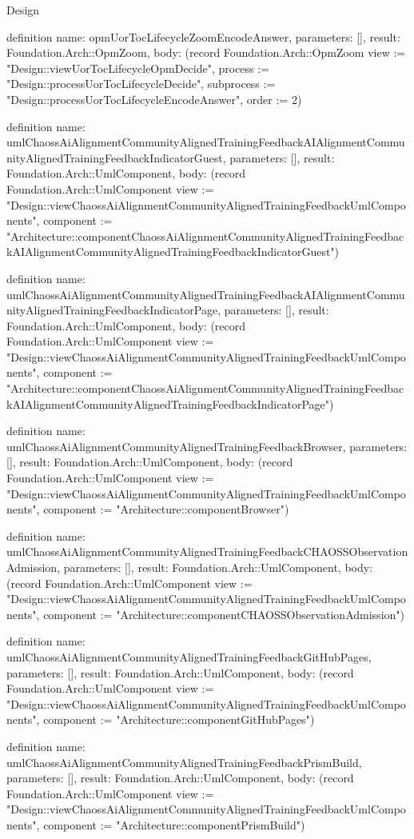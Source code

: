 \begin{lexlean}{Design}
\begin{semanticmodule}
definition{
  name: opmUorTocLifecycleZoomEncodeAnswer,
  parameters: [],
  result: Foundation.Arch::OpmZoom,
  body: (record Foundation.Arch::OpmZoom {view := "Design::viewUorTocLifecycleOpmDecide", process := "Design::processUorTocLifecycleDecide", subprocess := "Design::processUorTocLifecycleEncodeAnswer", order := 2})
}

definition{
  name: umlChaossAiAlignmentCommunityAlignedTrainingFeedbackAIAlignmentCommunityAlignedTrainingFeedbackIndicatorGuest,
  parameters: [],
  result: Foundation.Arch::UmlComponent,
  body: (record Foundation.Arch::UmlComponent {view := "Design::viewChaossAiAlignmentCommunityAlignedTrainingFeedbackUmlComponents", component := "Architecture::componentChaossAiAlignmentCommunityAlignedTrainingFeedbackAIAlignmentCommunityAlignedTrainingFeedbackIndicatorGuest"})
}

definition{
  name: umlChaossAiAlignmentCommunityAlignedTrainingFeedbackAIAlignmentCommunityAlignedTrainingFeedbackIndicatorPage,
  parameters: [],
  result: Foundation.Arch::UmlComponent,
  body: (record Foundation.Arch::UmlComponent {view := "Design::viewChaossAiAlignmentCommunityAlignedTrainingFeedbackUmlComponents", component := "Architecture::componentChaossAiAlignmentCommunityAlignedTrainingFeedbackAIAlignmentCommunityAlignedTrainingFeedbackIndicatorPage"})
}

definition{
  name: umlChaossAiAlignmentCommunityAlignedTrainingFeedbackBrowser,
  parameters: [],
  result: Foundation.Arch::UmlComponent,
  body: (record Foundation.Arch::UmlComponent {view := "Design::viewChaossAiAlignmentCommunityAlignedTrainingFeedbackUmlComponents", component := "Architecture::componentBrowser"})
}

definition{
  name: umlChaossAiAlignmentCommunityAlignedTrainingFeedbackCHAOSSObservationAdmission,
  parameters: [],
  result: Foundation.Arch::UmlComponent,
  body: (record Foundation.Arch::UmlComponent {view := "Design::viewChaossAiAlignmentCommunityAlignedTrainingFeedbackUmlComponents", component := "Architecture::componentCHAOSSObservationAdmission"})
}

definition{
  name: umlChaossAiAlignmentCommunityAlignedTrainingFeedbackGitHubPages,
  parameters: [],
  result: Foundation.Arch::UmlComponent,
  body: (record Foundation.Arch::UmlComponent {view := "Design::viewChaossAiAlignmentCommunityAlignedTrainingFeedbackUmlComponents", component := "Architecture::componentGitHubPages"})
}

definition{
  name: umlChaossAiAlignmentCommunityAlignedTrainingFeedbackPrismBuild,
  parameters: [],
  result: Foundation.Arch::UmlComponent,
  body: (record Foundation.Arch::UmlComponent {view := "Design::viewChaossAiAlignmentCommunityAlignedTrainingFeedbackUmlComponents", component := "Architecture::componentPrismBuild"})
}


\end{semanticmodule}
\end{lexlean}
